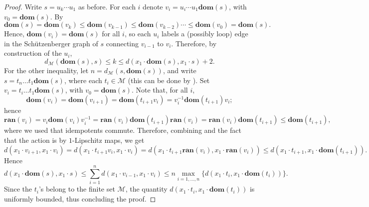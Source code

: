 \documentclass[10pt,a4paper]{amsart}
\newcommand{\dom}[1]{\mathbf{dom}\left(#1\right)}
\newcommand{\ran}[1]{\mathbf{ran}\left(#1\right)}
\begin{document}
\begin{proof}
   Write
    $s = u_{k} \cdots u_1$ as before. For each $i$ denote $v_{i} = u_{i} \cdots u_1 \dom{s}$, with $v_0 = \dom{s}$. By 
\[
	\dom{s} = \dom{v_{k}} 
	\leq \dom{v_{k-1}} \leq \dom{v_{k-2}} \cdots\leq \dom{v_0} = \dom{s}
.\]
Hence, $\dom{v_i} = \dom{s}$ for all $i$, so each $u_i$ labels a (possibly loop) edge in the Schützenberger graph of $s$ connecting $v_{i-1}$ to $v_i$. Therefore, by construction of the $u_i$,
$$d_{\mathcal{M}}( \dom{s}, s) \leq k \leq d(x_1 \cdot \dom{s}, x_1 \cdot s) + 2.$$
For the other inequality, let $n=d_{\mathcal M}(s,\dom{s})$, and write $s=t_n\ldots t_1\dom{s}$, where each $t_i\in \mathcal M$ (this can be done by ). Set $v_i=t_i\ldots t_1 \dom{s}$, with $v_0=\dom{s}$. Note that, for all $i$,
\[\dom{v_{i}} = \dom{v_{i+1}} = \dom{t_{i+1}v_{i}} = v_{i}^{-1}\dom{t_{i+1}}v_{i};\] hence
\[\ran{v_{i}}=v_i \dom{v_i}v_i^{-1}=\ran{v_i}\dom{t_{i+1}}\ran{v_i}= \ran{v_i}\dom{t_{i+1}}\leq \dom{t_{i+1}},\]
where we used that idempotents commute. Therefore, combining  and the fact that the action is by $1$-Lipschitz maps, we get
 \[
	 d(x_1 \cdot v_{i+1}, x_1 \cdot v_{i}) =d(x_1 \cdot t_{i+1}v_i, x_1 \cdot v_{i}) = d(x_1 \cdot t_{i+1} \ran{v_{i}}
	 , x_1 \cdot \ran{v_{i}})
	 \leq d(x_1 \cdot t_{i+1}, x_1 \cdot \dom{t_{i+1}})
.\]
Hence
\[
	d(x_1 \cdot \dom{s}, x_1 \cdot s)
	\leq \sum_{i=1}^{n} d(x_1 \cdot v_{i-1}, x_1 \cdot v_{i})\leq n \max_{i=1,\ldots, n} \{d(x_1 \cdot t_{i}, x_1 \cdot \dom{t_{i}}) \}.\]
Since the $t_i$'s belong to the finite set $\mathcal M$, the quantity $d(x_1 \cdot t_{i}, x_1 \cdot \dom{t_{i}})$ is uniformly bounded, thus concluding the proof.
\end{proof}
\end{document}
